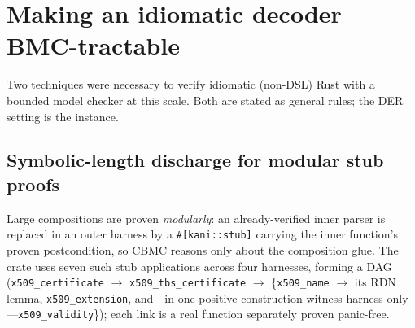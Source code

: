 \documentclass[10pt,twocolumn]{article}
\newcommand{\code}[1]{\texttt{\small #1}}
\begin{document}
\section{Making an idiomatic decoder BMC-tractable}
\label{sec:tractable}

Two techniques were necessary to verify idiomatic (non-DSL) Rust with a
bounded model checker at this scale. Both are stated as general rules; the DER
setting is the instance.

\subsection{Symbolic-length discharge for modular stub proofs}
\label{sec:symlen}

Large compositions are proven \emph{modularly}: an already-verified inner
parser is replaced in an outer harness by a \code{\#[kani::stub]} carrying the
inner function's proven postcondition, so CBMC reasons only about the
composition glue. The crate uses seven such stub applications across four
harnesses, forming a DAG (\code{x509\_certificate} $\to$
\code{x509\_tbs\_certificate} $\to$ \{\code{x509\_name} $\to$ its RDN lemma,
\code{x509\_extension}, and---in one positive-construction witness harness
only---\code{x509\_validity}\}); each link is a real function separately
proven panic-free.
\end{document}
